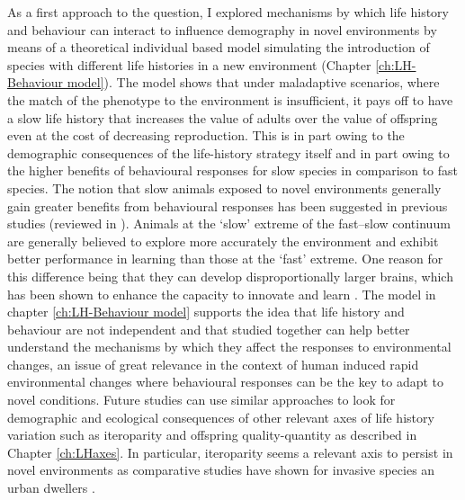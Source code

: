 As a first approach to the question, I explored mechanisms by which life history
and behaviour can interact to influence demography in novel environments
by means of a theoretical individual based model simulating the introduction of
species with different life histories in a new environment (Chapter
\ref{ch:LH-Behaviour model}). The model shows that under maladaptive scenarios,
where the match of the phenotype to the environment is insufficient, it pays
off to have a slow life history that increases the value of adults over the
value of offspring even at the cost of decreasing reproduction.
This is in part owing to the demographic consequences of the life-history
strategy itself and in part owing to the higher benefits of behavioural
responses for slow species in comparison to fast species.
The notion that slow animals exposed to novel environments generally gain
greater benefits from behavioural responses has been suggested in previous
studies (reviewed in \citet{Sol2016}). Animals at the ‘slow’ extreme of the
fast–slow continuum are generally believed to explore more accurately the
environment and exhibit better performance in learning than those at the ‘fast’
extreme. One reason for this difference being that they can develop
disproportionally larger brains, which has been shown to enhance the capacity
to innovate and learn
\citep{Lefebvre1997,Reader2002,Overington2009,Reader2011}. The model in chapter
\ref{ch:LH-Behaviour model} supports the idea that life history and behaviour
are not independent and that studied together can help better understand the
mechanisms by which they affect the responses to environmental changes, an issue
of great relevance in the context of human induced rapid environmental changes
where behavioural responses can be the key to adapt to novel conditions. Future
studies can use similar approaches to look for demographic and ecological
consequences of other relevant axes of life history variation such as
iteroparity and offspring quality-quantity as described in Chapter
\ref{ch:LHaxes}. In particular, iteroparity seems a relevant axis to persist in
novel environments as comparative studies have shown for invasive species
\citep{Sol2012a} an urban dwellers \citep{Sol2014,Sayol2020}.

